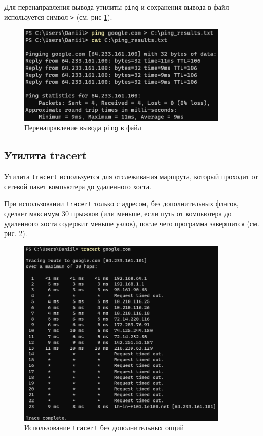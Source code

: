 \documentclass[a4paper, 14pt]{extarticle}
\begin{document}
Для перенаправления вывода утилиты \texttt{ping} и сохранения вывода в файл
используется символ \texttt{>} (см. рис \ref{fig:ping-file}).

\begin{figure}[H]
  \centering
  \includegraphics[width=0.9\textwidth]{images/ping/file.png}
  \caption{Перенаправление вывода \texttt{ping} в файл}
  \label{fig:ping-file}
\end{figure}

\subsection{Утилита tracert}

Утилита \texttt{tracert} используется для отслеживания маршрута, который
проходит от сетевой пакет компьютера до удаленного хоста.

При использовании \texttt{tracert} только с адресом, без дополнительных флагов,
сделает максимум 30 прыжков (или меньше, если путь от компьютера до удаленного
хоста содержит меньше узлов), после чего программа завершится (см. рис.
\ref{fig:tracert-default}).

\begin{figure}[H]
  \centering
  \includegraphics[width=0.9\textwidth]{images/tracert/default.png}
  \caption{Использование \texttt{tracert} без дополнительных опций}
  \label{fig:tracert-default}
\end{figure}
\end{document}
